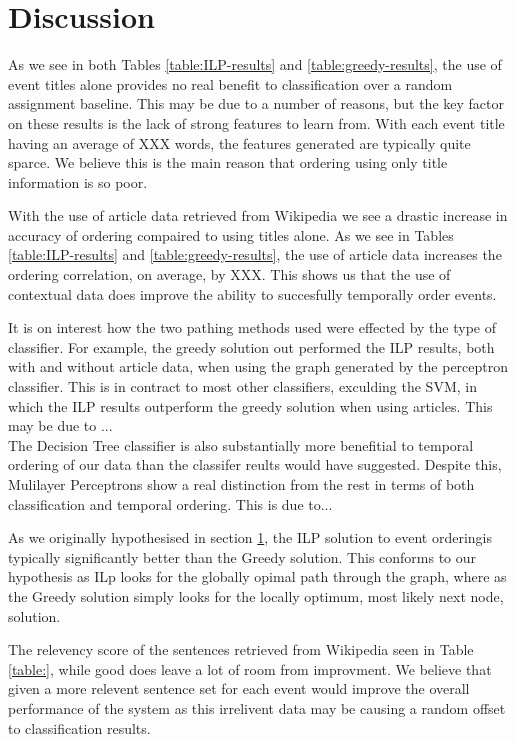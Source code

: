 \documentclass[bsc,frontabs,twoside,singlespacing,parskip,deptreport]{infthesis}     %
\begin{document}
\section{Discussion}

As we see in both Tables \ref{table:ILP-results} and \ref{table:greedy-results}, the use of event titles alone
provides no real benefit to classification over a random assignment baseline. This may be due to a number of reasons,
but the key factor on these results is the lack of strong features to learn from. With each event title having an average of
XXX words, the features generated are typically quite sparce. We believe this is the main reason that ordering using
only title information is so poor.

With the use of article data retrieved from Wikipedia we see a drastic increase in accuracy of ordering compaired to using
titles alone. As we see in Tables \ref{table:ILP-results} and \ref{table:greedy-results}, the use of article data
increases the ordering correlation, on average, by XXX. This shows us that the use of contextual data does improve the ability
to succesfully temporally order events.

It is on interest how the two pathing methods used were effected by the type of classifier.
For example, the greedy solution out performed the ILP results, both with and without article data,
when using the graph generated by the perceptron classifier. This is in contract to most other classifiers, exculding
the SVM, in which the ILP results outperform the greedy solution when using articles. This may be due to ...\\

The Decision Tree classifier is also substantially more benefitial to temporal ordering of our data than the classifer
reults would have suggested. Despite this, Mulilayer Perceptrons show a real distinction from the rest in terms of both
classification and temporal ordering. This is due to...


As we originally hypothesised in section \ref{}, the ILP solution to event orderingis typically significantly
better than the Greedy solution. This conforms to our hypothesis as ILp looks for the globally opimal path through
the graph, where as the Greedy solution simply looks for the locally optimum, most likely next node, solution.

The relevency score of the sentences retrieved from Wikipedia seen in Table \ref{table:}, while good does leave a lot of
room from improvment. We believe that given a more relevent sentence set for each event would improve the overall
performance of the system as this irrelivent data may be causing a random offset to classification results.
\end{document}
